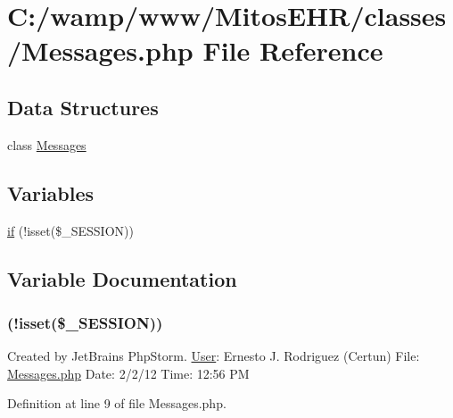 \hypertarget{_messages_8php}{\section{\-C\-:/wamp/www/\-Mitos\-E\-H\-R/classes/\-Messages.php \-File \-Reference}
\label{_messages_8php}
}
\subsection*{\-Data \-Structures}
\begin{DoxyCompactItemize}
\item 
class \hyperlink{class_messages}{\-Messages}
\end{DoxyCompactItemize}
\subsection*{\-Variables}
\begin{DoxyCompactItemize}
\item 
\hyperlink{_messages_8php_a8ceca98aa29914fd2479a84a8d2242fb}{if} (!isset(\$\-\_\-\-S\-E\-S\-S\-I\-O\-N))
\end{DoxyCompactItemize}


\subsection{\-Variable \-Documentation}
\hypertarget{_messages_8php_a8ceca98aa29914fd2479a84a8d2242fb}{
\subsubsection[{if}]{(!isset(\$\-\_\-\-S\-E\-S\-S\-I\-O\-N))}}\label{_messages_8php_a8ceca98aa29914fd2479a84a8d2242fb}
\-Created by \-Jet\-Brains \-Php\-Storm. \hyperlink{class_user}{\-User}\-: \-Ernesto \-J. \-Rodriguez (\-Certun) \-File\-: \hyperlink{_messages_8php}{\-Messages.\-php} \-Date\-: 2/2/12 \-Time\-: 12\-:56 \-P\-M 

\-Definition at line 9 of file \-Messages.\-php.

